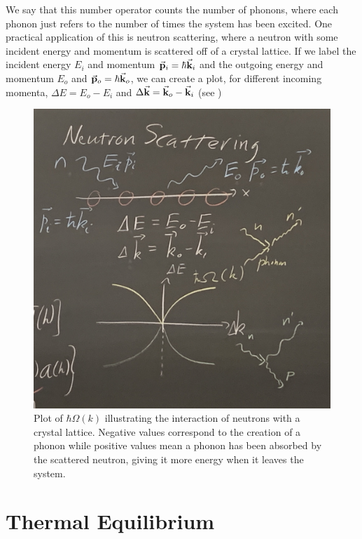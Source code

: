 \documentclass[a4paper,twoside,master.tex]{subfiles}
\begin{document}
We say that this number operator counts the number of phonons, where each phonon just refers to the number of times the system has been excited. One practical application of this is neutron scattering, where a neutron with some incident energy and momentum is scattered off of a crystal lattice. If we label the incident energy $ E_i $ and momentum $ \va{p}_i = \hbar \va{k}_i $ and the outgoing energy and momentum $ E_o $ and $ \va{p}_o = \hbar \va{k}_o $, we can create a plot, for different incoming momenta, $ \Delta E = E_o - E_i $ and $ \Delta \va{k} = \va{k}_o - \va{k}_i $ (see )

\begin{figure}[h]
    \centering
    \includegraphics[width=\textwidth/2]{figures/lec_38_neutron_scattering.jpg}
    \caption{Plot of $ \hbar \Omega(k) $ illustrating the interaction of neutrons with a crystal lattice. Negative values correspond to the creation of a phonon while positive values mean a phonon has been absorbed by the scattered neutron, giving it more energy when it leaves the system.}
    \label{fig:neutron_scattering}
\end{figure}

\section{Thermal Equilibrium}
\label{sec:thermal_equilibrium}
\end{document}
